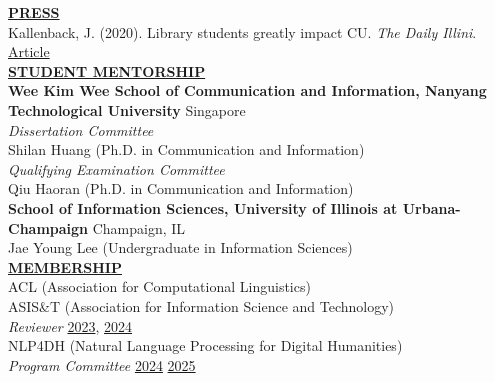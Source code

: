 \documentclass{article}
\begin{document}

\noindent \textbf{\underline{PRESS}} \\
\noindent Kallenback, J. (2020). Library students greatly impact CU. \textit{The Daily Illini}. \hfill \href{https://dailyillini.com/life_and_culture-stories/2020/11/11/library-students-greatly-impact-cu/}{Article} \\


\noindent \textbf{\underline{STUDENT MENTORSHIP}} \\
\noindent \textbf{Wee Kim Wee School of Communication and Information, Nanyang Technological University} \hfill Singapore \\
\noindent \textit{Dissertation Committee} \\
\noindent Shilan Huang (Ph.D. in Communication and Information) \\

\noindent \textit{Qualifying Examination Committee} \\
\noindent Qiu Haoran (Ph.D. in Communication and Information) \\

\noindent \textbf{School of Information Sciences, University of Illinois at Urbana-Champaign} \hfill Champaign, IL \\
\noindent Jae Young Lee (Undergraduate in Information Sciences) \\


\noindent \textbf{\underline{MEMBERSHIP}} \\ 
\noindent ACL (Association for Computational Linguistics) \\
\noindent ASIS\&T (Association for Information Science and Technology) \\
\textit{Reviewer} \hfill \href{https://www.asist.org/meetings-events/am/am23/2023-annual-meeting-reviewers/}{2023}, \href{https://www.asist.org/meetings-events/am/am24/2024-annual-meeting-reviewers/}{2024}\\
\noindent NLP4DH (Natural Language Processing for Digital Humanities) \\
\textit{Program Committee} \hfill \href{https://www.nlp4dh.com/nlp4dh-2024}{2024} \href{https://www.nlp4dh.com/nlp4dh-2025}{2025} \\
\end{document}
